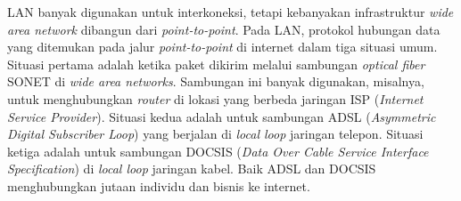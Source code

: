\begin{enumerate}
\end{enumerate}

LAN banyak digunakan untuk interkoneksi, tetapi kebanyakan infrastruktur \emph{wide area network} dibangun dari \emph{point-to-point}. Pada LAN, protokol hubungan data yang ditemukan pada jalur \emph{point-to-point} di internet dalam tiga situasi umum. Situasi pertama adalah ketika paket dikirim melalui sambungan \emph{optical fiber} SONET di \emph{wide area networks}. Sambungan ini banyak digunakan, misalnya, untuk menghubungkan \emph{router} di lokasi yang berbeda jaringan ISP (\emph{Internet Service Provider}). Situasi kedua adalah untuk sambungan ADSL (\emph{Asymmetric Digital Subscriber Loop}) yang berjalan di \emph{local loop} jaringan telepon. Situasi ketiga adalah untuk sambungan DOCSIS (\emph{Data Over Cable Service Interface Specification}) di \emph{local loop} jaringan kabel. Baik ADSL dan DOCSIS menghubungkan jutaan individu dan bisnis ke internet.

